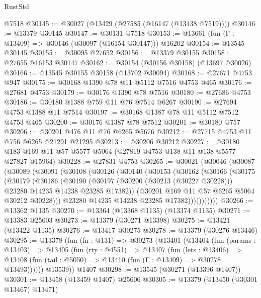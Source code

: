 \begin{lexlean}{RustStd}
\begin{coremodule}
    @7518
@30145 := @30027 (@13429 (@27585 (@16147 (@13438 @7519))))
@30146 := @13379 @30145
@30147 := @30131 @7518
@30153 := @13661 (fun (Γ : @13409) => @30146 (@30097 (@16154 @30147))) @16202
@30154 := @13545 @30145
@30155 := @30095 @27652
@30156 := @13379 @30155
@30158 := @27655 @16153 @30147
@30162 := @30154 (@30156 @30158) (@13697 @30026)
@30166 := @13545 @30155 @30158 (@13702 @30094)
@30168 := @27671 @4753 @947
@30175 := @30168 @1390 @78 @11 @5112 @7516 @4753 @465
@30176 := @27681 @4753
@30179 := @30176 @1390 @78 @7516
@30180 := @27686 @4753
@30186 := @30180 @1388 @759 @11 @76 @7514 @6267
@30190 := @27694 @4753 @1388 @11 @7514
@30197 := @30168 @1387 @78 @11 @5112 @7512 @4753 @465
@30200 := @30176 @1387 @78 @7512
@30201 := @30180 @757
@30206 := @30201 @476 @11 @76 @6265 @5676
@30212 := @27715 @4753 @11 @756 @6265 @21291 @21295
@30213 := @30206 @30212
@30227 := @30180 @183 @169 @11 @57 @5577 @5064 (@27819 @4753 @138 @11 @138 @5577 @27827 @15964)
@30228 := @27831 @4753
@30265 := @30021
    (@30046
      (@30087
        (@30089
          (@30091
            (@30108
              (@30126
                (@30140
                  (@30153
                    (@30162
                      (@30166
                        (@30175
                          (@30179
                            (@30186
                              (@30190
                                (@30197
                                  (@30200 (@30213 (@30227 @30228)))
                                  @23280
                                  @14235
                                  @14238
                                  @23285
                                  @17382))
                              (@30201 @169 @11 @57 @6265 @5064 @30212 @30228)))
                          @23280
                          @14235
                          @14238
                          @23285
                          @17382)))))))))))
@30266 := @13362 @1135
@30270 := @13364 (@13368 @1135) (@13374 @1135)
@30271 := @13383 @25603
@30273 := @13379 (@30271 @13398)
@30275 := @13421 (@13422 @1135)
@30276 := @13417 @30275
@30278 := @13379 (@30276 @13446)
@30295 := @13378
    (fun (fn : @131) =>
    @30273
      (@13401
        (@13404
          (fun (params : @13403) =>
          @13405
            (fun (rty : @4551) =>
            @13407
              (fun (lets : @13406) =>
              @13408 (fun (tail : @5050) => @13410 (fun (Γ : @13409) => @30278 @13493))))))
        @13539))
    @1407
@30298 := @13545 (@30271 (@13396 @1407))
@30301 := @13458 (@13459 @1407) @25606
@30305 := @13379 (@13450 (@30301 @13467) @13471)

\end{coremodule}
\end{lexlean}
